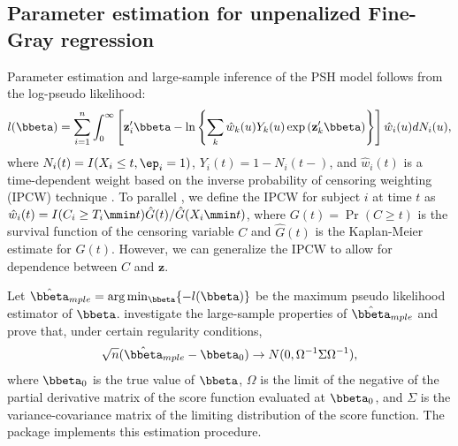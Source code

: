 \subsection{Parameter estimation for unpenalized Fine-Gray regression}
Parameter estimation and large-sample inference of the PSH model follows from the log-pseudo likelihood:
\begin{align}
\label{eq3:lpp}
l(\bbeta) = \sum_{i=1}^n  \int_0^\infty \left[ \mathbf{z}_i^\prime \bbeta - \ln \left\{ \sum_k \hat{w}_k(u) Y_k(u) \exp \left(\mathbf{z}_k^\prime \bbeta \right) \right\} \right] \hat{w}_i(u)dN_i(u),
\end{align}
where $N_i(t) = I(X_i \leq t, \ep_i = 1)$, $Y_i(t) = 1 - N_i(t-)$, and $\hat{w}_i(t)$ is a time-dependent weight based on the inverse probability of censoring weighting (IPCW) technique \citep{robins1992recovery}. To parallel \cite{fine1999proportional}, we define the  IPCW for subject $i$ at time $t$ as $\hat{w}_i(t) = I(C_i \geq T_i \mmin t)\hat{G}(t)/\hat{G}(X_i \mmin t)$, where $G(t) = \Pr(C \geq t)$ is the survival function of the censoring variable $C$ and $\hat{G}(t)$ is the Kaplan-Meier estimate for $G(t)$. However, we can generalize the IPCW to allow for dependence between $C$ and $\mathbf{z}$.

Let $\hat{\bbeta}_{mple} = \arg \min_{\bbeta} \{-l(\bbeta)\}$ be the maximum pseudo likelihood estimator of $\bbeta$. \cite{fine1999proportional} investigate the large-sample properties of $\hat{\bbeta}_{mple}$ and prove that, under certain regularity conditions, 
\begin{align}
\sqrt{n}(\hat{\bbeta}_{mple} - \bbeta_0) \to N(0, \Omega^{-1} \Sigma \Omega^{-1}),
\end{align}
where $\bbeta_0$ is the true value of $\bbeta$, $\Omega$ is the limit of the negative of the partial derivative matrix of the score function evaluated at $\bbeta_0$, and $\Sigma$ is the variance-covariance matrix of the limiting distribution of the score function. The package  implements this estimation procedure. 

